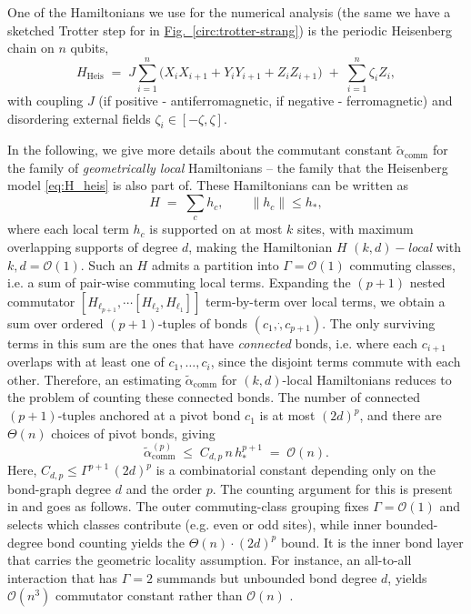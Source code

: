 One of the Hamiltonians we use for the numerical analysis (the same we have a sketched Trotter step for in \hyperref[circ:trotter-strang]{Fig.~\ref*{circ:trotter-strang}}) is the periodic Heisenberg chain on $n$ qubits, 
\begin{equation} \label{eq:H_heis}
    H_{\mathrm{Heis}}
\;=\; J \sum_{i=1}^{n} \bigl( X_i X_{i+1} + Y_i Y_{i+1} + Z_i Z_{i+1} \bigr)
\;+\; \sum_{i=1}^{n} \zeta_i Z_i,
\end{equation}
with coupling $J$ (if positive - antiferromagnetic, if negative - ferromagnetic) and disordering external fields $\zeta_i \in [-\zeta,\zeta]$. 

In the following, we give more details about the commutant constant $\tilde{\alpha}_\mathrm{comm}$ for the family of \emph{geometrically local} Hamiltonians -- the family that the Heisenberg model \eqref{eq:H_heis} is also part of. These Hamiltonians can be written as
$$
 H \;=\; \sum_c h_c, \qquad \|h_c\| \le h_*, 
$$
where each local term $h_c$ is supported on at most $k$ sites, with maximum overlapping supports of degree $d$, making the Hamiltonian $H$ $(k, d)-$\emph{local} with $k, d = \mathcal{O}(1)$. Such an $H$ admits a partition into $\Gamma = \mathcal{O}(1)$ commuting classes, i.e. a sum of pair-wise commuting local terms. Expanding the $(p+1)$ nested commutator $[H_{\ell_{p+1}}, \cdots [H_{\ell_2}, H_{\ell_1}]]$ term-by-term over local terms, we obtain a sum over ordered $(p+1)$-tuples of bonds $(c_1, \dot, c_{p+1})$. The only surviving terms in this sum are the ones that have \emph{connected} bonds, i.e. where each $c_{i+1}$ overlaps with at least one of $c_1, \dots, c_i$, since the disjoint terms commute with each other. Therefore, an estimating $\tilde{\alpha}_\mathrm{comm}$ for $(k,d)$-local Hamiltonians reduces to the problem of counting these connected bonds. The number of connected $(p+1)$-tuples anchored at a pivot bond $c_1$ is at most $(2d)^p$, and there are $\Theta(n)$ choices of pivot bonds, giving
\begin{equation} \label{eq:alpha-comm}
\tilde\alpha^{(p)}_{\mathrm{comm}} \;\leq\; C_{d,p}\,n\,h_*^{p+1} \;=\; \mathcal{O}(n).
\end{equation}
Here, $C_{d,p} \le \Gamma^{p+1}\,(2d)^p$ is a combinatorial constant depending only on the bond-graph degree $d$ and the order $p$. The counting argument for this is present in \cite[Sec. V B]{childs2021theory} and goes as follows. The outer commuting-class grouping fixes $\Gamma = \mathcal{O}(1)$ and selects which classes contribute (e.g. even or odd sites), while inner bounded-degree bond counting yields the $\Theta(n)\cdot(2d)^p$ bound. It is the inner bond layer that carries the geometric locality assumption. For instance, an all-to-all interaction that has $\Gamma = 2$ summands but unbounded bond degree $d$, yields $\mathcal{O}(n^3)$ commutator constant rather than $\mathcal{O}(n)$ \cite[Sec. IV C]{childs2021theory}.

